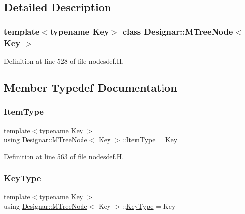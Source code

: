 \subsection{Detailed Description}
\subsubsection*{template$<$typename Key$>$\newline
class Designar\+::\+M\+Tree\+Node$<$ Key $>$}



Definition at line 528 of file nodesdef.\+H.



\subsection{Member Typedef Documentation}
\mbox{\label{class_designar_1_1_m_tree_node_aa649a0376eb81e3da0f4dcbd36871b4b}} 
\subsubsection{\texorpdfstring{Item\+Type}{ItemType}}
{\footnotesize\ttfamily template$<$typename Key $>$ \\
using \hyperlink{class_designar_1_1_m_tree_node}{Designar\+::\+M\+Tree\+Node}$<$ Key $>$\+::\hyperlink{class_designar_1_1_m_tree_node_aa649a0376eb81e3da0f4dcbd36871b4b}{Item\+Type} =  Key}



Definition at line 563 of file nodesdef.\+H.

\mbox{\label{class_designar_1_1_m_tree_node_ad45f6141e36722448b45aecde08761a0}} 
\subsubsection{\texorpdfstring{Key\+Type}{KeyType}}
{\footnotesize\ttfamily template$<$typename Key $>$ \\
using \hyperlink{class_designar_1_1_m_tree_node}{Designar\+::\+M\+Tree\+Node}$<$ Key $>$\+::\hyperlink{class_designar_1_1_m_tree_node_ad45f6141e36722448b45aecde08761a0}{Key\+Type} =  Key}



